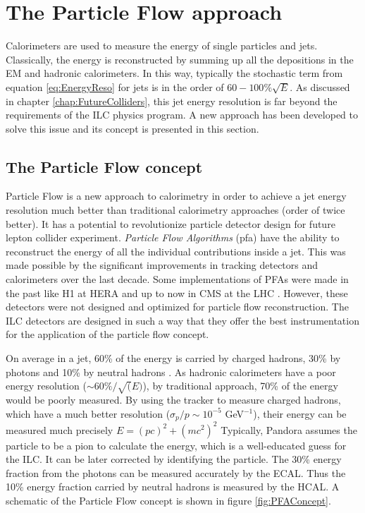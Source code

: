 \section{The Particle Flow approach}
\label{sec:PFA}

Calorimeters are used to measure the energy of single particles and jets. Classically, the energy is reconstructed by summing up all the depositions in the EM and hadronic calorimeters. In this way, typically the stochastic term from equation \ref{eq:EnergyReso} for jets is in the order of $60-100\%\sqrt{E}$. As discussed in chapter \ref{chap:FutureColliders}, this jet energy resolution is far beyond the requirements of the ILC physics program. A new approach has been developed to solve this issue and its concept is presented in this section.

\subsection{The Particle Flow concept}

Particle Flow is a new approach to calorimetry in order to achieve a jet energy resolution much better than traditional calorimetry approaches (order of twice better). It has a potential to revolutionize particle detector design for future lepton collider experiment. \textit{Particle Flow Algorithms} (\acrshort{pfa}) have the ability to reconstruct the energy of all the individual contributions inside a jet. This was made possible by the significant improvements in tracking detectors and calorimeters over the last decade. Some implementations of PFAs were made in the past like H1 at HERA \cite{Abt:1994ye} and up to now in CMS at the LHC \cite{Sirunyan:2017ulk}. However, these detectors were not designed and optimized for particle flow reconstruction. The ILC detectors are designed in such a way that they offer the best
instrumentation for the application of the particle flow concept.

On average in a jet, 60\% of the energy is carried by charged hadrons, 30\% by photons and 10\% by neutral hadrons \cite{Ebrahimi:394104}. As hadronic calorimeters have a poor energy resolution ($\sim 60\%/\sqrt(E)$), by traditional approach, 70\% of the energy would be poorly measured. By using the tracker to measure charged hadrons, which have a much better resolution ($\sigma_p/p \sim 10^{-5}$ GeV$^{-1}$), their energy can be measured much precisely $E = (pc)^2 + (mc^2)^2$ Typically, Pandora assumes the particle to be a pion to calculate the energy, which is a well-educated guess for the ILC. It can be later corrected by identifying the particle. The 30\% energy fraction from the photons can be measured accurately by the ECAL. Thus the 10\% energy fraction carried by neutral hadrons is measured by the HCAL. A schematic of the Particle Flow concept is shown in figure \ref{fig:PFAConcept}.

